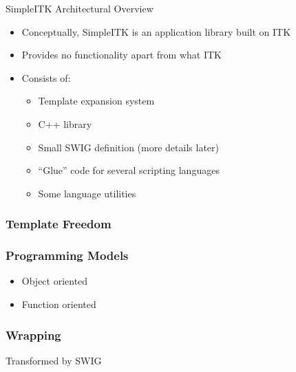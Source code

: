 \begin{frame}{SimpleITK Architectural Overview}
\begin{itemize}
\item Conceptually, SimpleITK is an application library built on ITK
\item Provides no functionality apart from what ITK
\item Consists of:
  \begin{itemize}
    \item Template expansion system
    \item C++ library
    \item Small SWIG definition (more details later)
    \item ``Glue'' code for several scripting languages
    \item Some language utilities
  \end{itemize}
\end{itemize}
\end{frame}


\begin{frame}
\frametitle{Template Freedom}
\end{frame}

\begin{frame}
\frametitle{Programming Models}
\begin{itemize}
\item Object oriented
\item Function oriented
\end{itemize}
\end{frame}

\begin{frame}
\frametitle{Wrapping}
Transformed by SWIG
\end{frame}





